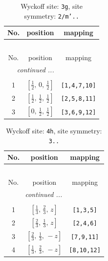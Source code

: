 \documentclass[fleqn,8pt]{jsarticle}
\begin{document}
\begin{longtable}{ccc}
\caption{Wyckoff site: {\tt 3g}, site symmetry: {\tt 2/m'..}}
 \\
 \hline \hline
No. & position & mapping \\ \hline \endfirsthead

\multicolumn{2}{l}{\tablename\ \thetable{}} \\
 \hline \hline
No. & position & mapping \\ \hline \endhead

 \hline \hline
\multicolumn{2}{r}{\footnotesize\it continued ...} \\ \endfoot

 \hline \hline
\multicolumn{2}{r}{} \\ \endlastfoot

1 & $\left[ \frac{1}{2},\, 0,\, \frac{1}{2} \right]$ & {\tt [1,4,7,10]} \\ \hline
2 & $\left[ \frac{1}{2},\, \frac{1}{2},\, \frac{1}{2} \right]$ & {\tt [2,5,8,11]} \\ \hline
3 & $\left[ 0,\, \frac{1}{2},\, \frac{1}{2} \right]$ & {\tt [3,6,9,12]} \\
\end{longtable}
\renewcommand{\arraystretch}{1.2}
\begin{longtable}{ccc}
\caption{Wyckoff site: {\tt 4h}, site symmetry: {\tt 3..}}
 \\
 \hline \hline
No. & position & mapping \\ \hline \endfirsthead

\multicolumn{2}{l}{\tablename\ \thetable{}} \\
 \hline \hline
No. & position & mapping \\ \hline \endhead

 \hline \hline
\multicolumn{2}{r}{\footnotesize\it continued ...} \\ \endfoot

 \hline \hline
\multicolumn{2}{r}{} \\ \endlastfoot

1 & $\left[ \frac{1}{3},\, \frac{2}{3},\, z \right]$ & {\tt [1,3,5]} \\ \hline
2 & $\left[ \frac{2}{3},\, \frac{1}{3},\, z \right]$ & {\tt [2,4,6]} \\ \hline
3 & $\left[ \frac{2}{3},\, \frac{1}{3},\, - z \right]$ & {\tt [7,9,11]} \\ \hline
4 & $\left[ \frac{1}{3},\, \frac{2}{3},\, - z \right]$ & {\tt [8,10,12]} \\
\end{longtable}
\end{document}
